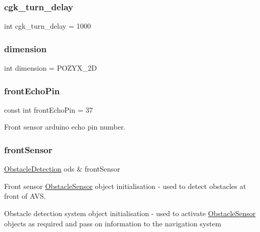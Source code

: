 \subsubsection{\texorpdfstring{cgk\+\_\+turn\+\_\+delay}{cgk\_turn\_delay}}
{\footnotesize\ttfamily int cgk\+\_\+turn\+\_\+delay = 1000}

\mbox{\label{bot_main_8ino_a1a8a8235879363159315091a1daed72f}} 
\subsubsection{\texorpdfstring{dimension}{dimension}}
{\footnotesize\ttfamily int dimension = P\+O\+Z\+Y\+X\+\_\+2D}

\mbox{\label{bot_main_8ino_a0b14c45d0e2dfeef70f98b914ca277f5}} 
\subsubsection{\texorpdfstring{front\+Echo\+Pin}{frontEchoPin}}
{\footnotesize\ttfamily const int front\+Echo\+Pin = 37}



Front sensor arduino echo pin number. 

\mbox{\label{bot_main_8ino_a355879266d10af4a6e9126a47bc09113}} 
\subsubsection{\texorpdfstring{front\+Sensor}{frontSensor}}
{\footnotesize\ttfamily \mbox{\hyperlink{class_obstacle_detection}{Obstacle\+Detection}} ods \& front\+Sensor}



Front sensor \mbox{\hyperlink{class_obstacle_sensor}{Obstacle\+Sensor}} object initialisation -\/ used to detect obstacles at front of A\+VS. 

Obstacle detection system object initialisation -\/ used to activate \mbox{\hyperlink{class_obstacle_sensor}{Obstacle\+Sensor}} objects as required and pass on information to the navigation system \mbox{\label{bot_main_8ino_ad681cfe410d5d764c513368773b9de93}} 
